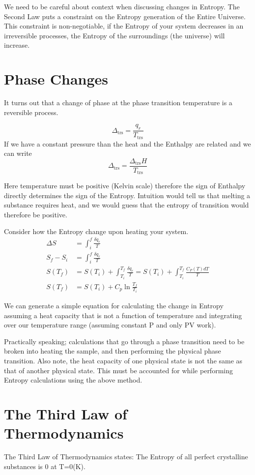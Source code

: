 \documentclass{article}
\newcommand{\be}{\begin{equation}}
\newcommand{\ee}{\end{equation}}
\begin{document}
We need to be careful about context when discussing changes in Entropy. 
The Second Law puts a constraint on the Entropy generation of the Entire Universe. 
This constraint is non-negotiable, if the Entropy of your system decreases in an irreversible processes, the Entropy of the surroundings (the universe) will increase. 

\section*{Phase Changes}
It turns out that a change of phase at the phase transition temperature is a reversible process. 

\be
\Delta_{\text{trs}} = \frac{q_r}{T_{\text{trs}}}
\ee
If we have a constant pressure than the heat and the Enthalpy are related and we can write
\be
\Delta_{\text{trs}} = \frac{\Delta_{\text{trs}}H}{T_{\text{trs}}}
\ee

Here temperature must be positive (Kelvin scale) therefore the sign of Enthalpy directly determines the sign of the Entropy. 
Intuition would tell us that melting a substance requires heat, and we would guess that the entropy of transition would therefore be positive.

Consider how the Entropy change upon heating your system. 
\be
\begin{split}
\Delta S &= \int_i^f \frac{\delta q_r}{T} \\
S_f - S_i &= \int_i^f \frac{\delta q_r}{T} \\
S(T_f) &= S(T_i) + \int_{T_i}^{T_f} \frac{\delta q_r}{T} = S(T_i) + \int_{T_i}^{T_f} \frac{C_P(T)dT}{T} \\
S(T_f) &= S(T_i) + C_p \ln\frac{T_f}{T_i}
\end{split}
\ee

We can generate a simple equation for calculating the change in Entropy assuming a heat capacity that is not a function of temperature and integrating over our temperature range (assuming constant P and only PV work). 

Practically speaking; calculations that go through a phase transition need to be broken into heating the sample, and then performing the physical phase transition. 
Also note, the heat capacity of one physical state is not the same as that of another physical state.
This must be accounted for while performing Entropy calculations using the above method. 

\section*{The Third Law of Thermodynamics}
The Third Law of Thermodynamics states: The Entropy of all perfect crystalline substances is 0 at T=0(K). 
\end{document}
